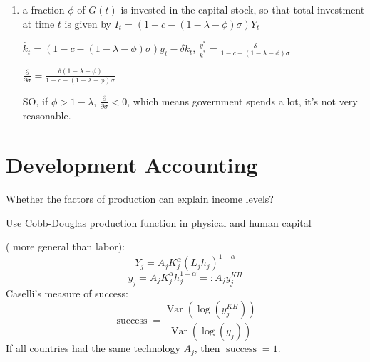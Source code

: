 \documentclass{article}
\newcommand{\backassign}{=:}
\newcommand{\tmop}[1]{\ensuremath{\operatorname{#1}}}
\newenvironment{enumeratealpha}{\begin{enumerate}[a{\textup{)}}] }{\end{enumerate}}
\begin{document}
\begin{question}
\begin{enumeratealpha}
    As in the baseline Solow model, the capital-labor ratio in this economy
    converges to a unique positive steady state level $k^{\ast}$ characterized
    by
    
    $\frac{y^{\ast}}{k^{\ast}} = \frac{\delta}{1 - c - \sigma (1 - \lambda)}$
    
    The unique solution $k^{\ast}$ is decreasing in $\sigma$ and increasing in
    $\lambda$ since $f (k) / k$ is a decreasing
    
    function of $k$. In the economy with higher government spending (higher
    $\sigma$), the capital-labor
    
    ratio is lower at all times, and in particular, is also lower at the
    steady state. Also, the more
    
    individuals reduce their consumption in response to government spending
    and taxes (higher
    
    $\lambda$), the more they save, the higher the capital-labor ratio at all
    times and, in particular, the
    
    higher the steady state capital-labor ratio.
    
    \item a fraction $\phi$ of $G (t)$ is invested in the capital stock, so
    that total investment at time $t$ is given by $I_t = (1 - c - (1 - \lambda
    - \phi) \sigma) Y_t$
    
    $\dot{k_t} = (1 - c - (1 - \lambda - \phi) \sigma) y_t - \delta k_t $,
    $\frac{y^{\ast}}{k^{\ast}} = \frac{\delta}{1 - c - (1 - \lambda - \phi)
    \sigma}$
    
    $\frac{\partial}{\partial \sigma} = \frac{\delta (1 - \lambda - \phi)}{1 -
    c - (1 - \lambda - \phi) \sigma}$
    
    SO, if $\phi > 1 - \lambda$, $\frac{\partial}{\partial \sigma} < 0$, which
    means government spends a lot, it's not very reasonable.
  \end{enumeratealpha}
\end{question}

\section{Development Accounting}

Whether the factors of production can explain income levels?

Use Cobb-Douglas production function in physical and human capital

({\rightarrow} more general than labor):
\[ Y_j = A_j K_j^{\alpha} (L_j h_j)^{1 - \alpha} \]
\[ y_j = A_j K_j^{\alpha} h_j^{1 - \alpha} \backassign A_j y_j^{K H} \]
Caselli's measure of success:
\[ \tmop{success} = \frac{\tmop{Var} (\log (y_j^{K H}))}{\tmop{Var} (\log
   (y_j))} \]
If all countries had the same technology $A_j$, then $\tmop{success} = 1$.
\end{document}
